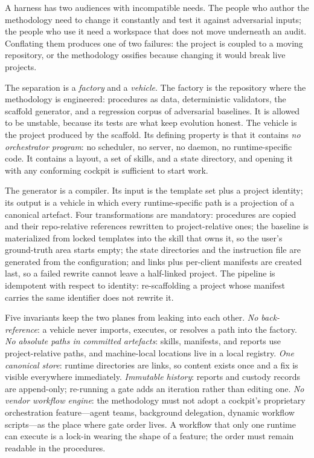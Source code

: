 \documentclass[10pt,a4paper]{article}
\theoremstyle{definition}
\theoremstyle{plain}
\theoremstyle{principle}
\begin{document}
A harness has two audiences with incompatible needs. The people who author the methodology need to
change it constantly and test it against adversarial inputs; the people who use it need a
workspace that does not move underneath an audit. Conflating them produces one of two failures:
the project is coupled to a moving repository, or the methodology ossifies because changing it
would break live projects.

The separation is a \emph{factory} and a \emph{vehicle}. The factory is the repository where the
methodology is engineered: procedures as data, deterministic validators, the scaffold generator,
and a regression corpus of adversarial baselines. It is allowed to be unstable, because its tests
are what keep evolution honest. The vehicle is the project produced by the scaffold. Its defining
property is that it contains \emph{no orchestrator program}: no scheduler, no server, no daemon,
no runtime-specific code. It contains a layout, a set of skills, and a state directory, and
opening it with any conforming cockpit is sufficient to start work.

The generator is a compiler. Its input is the template set plus a project identity; its output is
a vehicle in which every runtime-specific path is a projection of a canonical artefact. Four
transformations are mandatory: procedures are copied and their repo-relative references rewritten
to project-relative ones; the baseline is materialized from locked templates into the skill that
owns it, so the user's ground-truth area starts empty; the state directories and the instruction
file are generated from the configuration; and links plus per-client manifests are created last,
so a failed rewrite cannot leave a half-linked project. The pipeline is idempotent with respect
to identity: re-scaffolding a project whose manifest carries the same identifier does not rewrite
it.

Five invariants keep the two planes from leaking into each other. \emph{No back-reference}: a
vehicle never imports, executes, or resolves a path into the factory. \emph{No absolute paths in
committed artefacts}: skills, manifests, and reports use project-relative paths, and machine-local
locations live in a local registry. \emph{One canonical store}: runtime directories are links, so
content exists once and a fix is visible everywhere immediately. \emph{Immutable history}: reports
and custody records are append-only; re-running a gate adds an iteration rather than editing one.
\emph{No vendor workflow engine}: the methodology must not adopt a cockpit's proprietary
orchestration feature---agent teams, background delegation, dynamic workflow scripts---as the place
where gate order lives. A workflow that only one runtime can execute is a lock-in wearing the shape
of a feature; the order must remain readable in the procedures.
\end{document}
